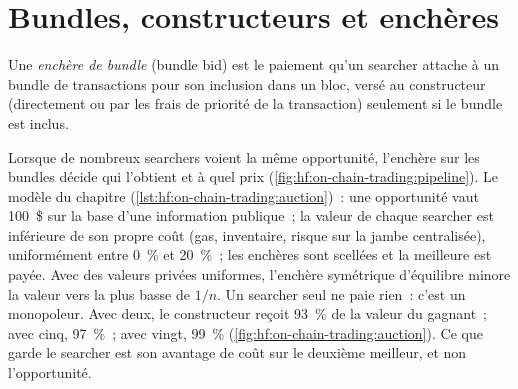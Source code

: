 \section{Bundles, constructeurs et enchères}

\begin{definition}\label{def:hf:on-chain-trading:bid}
Une \emph{enchère de bundle} (bundle bid) est le paiement qu'un searcher attache à un bundle de transactions pour son inclusion dans un bloc, versé au constructeur
(directement ou par les frais de priorité de la transaction) seulement si le bundle est inclus.
\end{definition}

Lorsque de nombreux searchers voient la même opportunité, l'enchère sur les bundles décide qui l'obtient et à quel prix
(\cref{fig:hf:on-chain-trading:pipeline}). Le modèle du chapitre (\cref{lst:hf:on-chain-trading:auction})~: une opportunité vaut 100~\$ sur la base d'une information
publique~; la valeur de chaque searcher est inférieure de son propre coût (gas, inventaire, risque sur la jambe centralisée), uniformément entre 0~\% et 20~\%~; les enchères
sont scellées et la meilleure est payée. Avec des valeurs privées uniformes, l'enchère symétrique d'équilibre minore la valeur vers la plus basse de $1/n$. Un
searcher seul ne paie rien~: c'est un monopoleur. Avec deux, le constructeur reçoit 93~\% de la valeur du gagnant~; avec cinq, 97~\%~; avec vingt, 99~\%
(\cref{fig:hf:on-chain-trading:auction}). Ce que garde le searcher est son avantage de coût sur le deuxième meilleur, et non l'opportunité.

